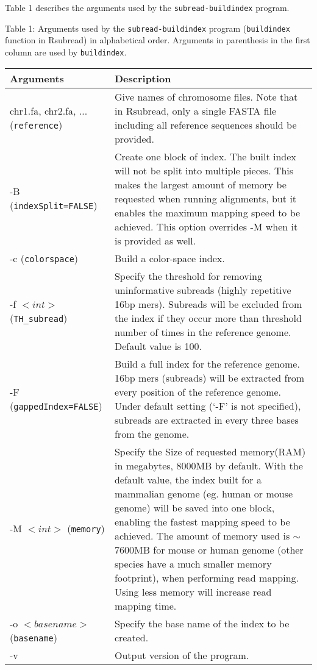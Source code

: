 \documentclass[12pt]{report}
\newcommand{\code}[1]{{\small\texttt{#1}}}
\newcommand{\Rsubread}{\textsf{Rsubread}}
\begin{document}
Table 1 describes the arguments used by the \code{subread-buildindex} program.

\newpage

\begin{table}[h]
\raggedright{Table 1: Arguments used by the \code{subread-buildindex} program (\code{buildindex} function in \Rsubread) in alphabetical order.
Arguments in parenthesis in the first column are used by \code{buildindex}.\newline\\}
\begin{tabular}{|p{4cm}|p{12cm}|}
\hline
Arguments & Description \\
\hline
chr1.fa, chr2.fa, ... \newline (\code{reference}) & Give names of chromosome files. Note that in {\Rsubread}, only a single FASTA file including all reference sequences should be provided.\\
\hline
-B \newline (\code{indexSplit=FALSE}) & Create one block of index.  The built index will not be split into multiple pieces. This makes the largest amount of memory be requested when running alignments, but it enables the maximum mapping speed to be achieved. This option overrides -M when it is provided as well.\\
\hline
-c \newline (\code{colorspace}) & Build a color-space index.\\
\hline
-f $<int>$ \newline (\code{TH\_subread}) & Specify the threshold for removing uninformative subreads (highly repetitive 16bp mers). Subreads will be excluded from the index if they occur more than threshold number of times in the reference genome. Default value is 100.\\
\hline
-F \newline (\code{gappedIndex=FALSE}) & Build a full index for the reference genome. 16bp mers (subreads) will be extracted from every position of the reference genome. Under default setting (`-F' is not specified), subreads are extracted in every three bases from the genome.\\
\hline
-M $<int>$ \newline (\code{memory}) & Specify the Size of requested memory(RAM) in megabytes, 8000MB by default. With the default value, the index built for a mammalian genome (eg. human or mouse genome) will be saved into one block, enabling the fastest mapping speed to be achieved. The amount of memory used is $\sim$ 7600MB for mouse or human genome (other species have a much smaller memory footprint), when performing read mapping. Using less memory will increase read mapping time.\\
\hline
-o $<basename>$ \newline (\code{basename}) & Specify the base name of the index to be created.\\
\hline
-v & Output version of the program. \\
\hline
\end{tabular}
\end{table}
\end{document}
